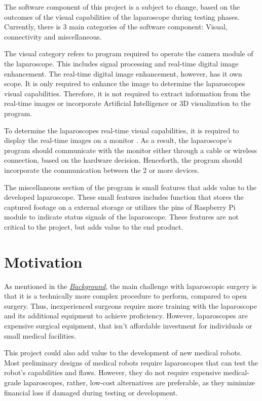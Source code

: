 The software component of this project is a subject to change, based on the outcomes of the visual capabilities of the laparoscope during testing phases. Currently, there is 3 main categories of the software component: Visual, connectivity and miscellaneous.

\vspace{0.5cm}
\noindent
The visual category refers to program required to operate the camera module of the laparoscope. This includes signal processing and real-time digital image enhancement. The real-time digital image enhancement, however, has it own scope. It is only required to enhance the image to determine the laparoscopes visual capabilities. Therefore, it is not required to extract information from the real-time images or incorporate Artificial Intelligence or 3D visualization to the program.

\vspace{0.5cm}
\noindent
To determine the laparoscopes real-time visual capabilities, it is required to display the real-time images on a monitor . As a result, the laparoscope's program should communicate with the monitor either through a cable or wireless connection, based on the hardware decision. Henceforth, the program should incorporate the communication between the 2 or more devices.

\vspace{0.5cm}
\noindent
The miscellaneous section of the program is small features that adds value to the developed laparoscope. These small features includes function that stores the captured footage on a external storage or utilizes the pins of Raspberry Pi module to indicate status signals of the laparoscope. These features are not critical to the project, but adds value to the end product.


\section{Motivation}

As mentioned in the \textit{\hyperref[sec:Background]{Background}}, the main challenge with laparoscopic surgery is that it is a technically more complex procedure to perform, compared to open surgery. Thus, inexperienced surgeons require more training with the laparoscope and its additional equipment to achieve proficiency. However, laparoscopes are expensive surgical equipment, that isn't affordable investment for individuals or small medical facilities.

\vspace{0.5cm}
\noindent
This project could also add value to the development of new medical robots. Most preliminary designs of medical robots require laparoscopes that can test the robot's capabilities and flaws. However, they do not require expensive medical-grade laparoscopes, rather, low-cost alternatives are preferable, as they minimize financial loss if damaged during testing or development. 

